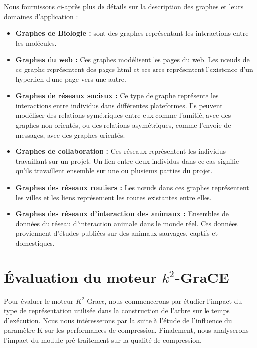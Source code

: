 	
	Nous fournissons ci-après plus de détails sur la description des graphes et leurs domaines d'application :
	\begin{itemize}
	
	
	\item \textbf{Graphes de Biologie :} sont des graphes représentant les interactions entre les molécules.
	
	\item \textbf{Graphes du web :} Ces graphes  modélisent les pages du web. Les nœuds de ce graphe représentent des pages html et ses arcs représentent l'existence d'un hyperlien d'une page vers une autre.  

	\item \textbf{Graphes de réseaux sociaux :} Ce type de graphe représente les interactions entre individus dans différentes plateformes. Ils peuvent modéliser des relations symétriques entre eux comme l'amitié, avec des graphes non orientés, ou des relations asymétriques, comme l'envoie de messages, avec des graphes orientés.

	\item \textbf{Graphes de collaboration :} Ces réseaux représentent les individus travaillant sur un projet. Un lien entre deux individus dans ce cas signifie qu'ils travaillent ensemble sur une ou plusieurs parties du projet. 

	\item \textbf{Graphes des réseaux routiers :}  Les nœuds dans ces graphes représentent les villes et les liens représentent les routes existantes entre elles.
	
	\item \textbf{Graphes des réseaux d'interaction des animaux :} Ensembles de données du réseau d'interaction animale dans le monde réel. Ces données proviennent d'études publiées sur des animaux sauvages, captifs et domestiques.
	
	
	\end{itemize}
	
	\section{Évaluation du moteur $k^2$-GraCE}
	Pour évaluer le moteur $K^2$-Grace, nous commencerons par étudier l'impact du type de représentation utilisée dans la construction de l'arbre sur le temps d'exécution. Nous nous intéresserons par la suite à l'étude de l'influence du paramètre K sur les performances de compression.
	Finalement, nous  analyserons  l'impact  du module pré-traitement sur la qualité de compression. 
